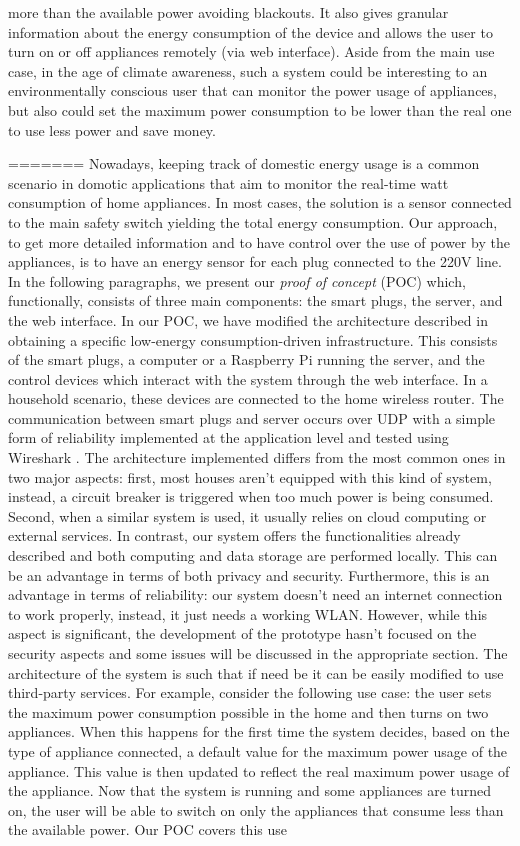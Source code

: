 \documentclass[conference]{IEEEtran}
\begin{document}
more than the available power avoiding blackouts. It also gives granular information about the energy consumption of the device and allows the user to turn on or off appliances remotely (via web interface). Aside from the main use case, in the age of climate awareness, such a system could be interesting to an environmentally conscious user that can monitor the power usage of appliances, but also could set the maximum power consumption to be lower than the real one to use less power and save money. 
	
=======
	Nowadays, keeping track of domestic energy usage is a common scenario in domotic applications that aim to monitor the real-time watt consumption of home appliances. In most cases, the solution is a sensor connected to the main safety switch yielding the total energy consumption. Our approach, to get more detailed information and to have control over the use of power by the appliances, is to have an energy sensor for each plug connected to the 220V line. In the following paragraphs, we present our \textit{proof of concept} (POC) which, functionally, consists of three main components: the smart plugs, the server, and the web interface. In our POC, we have modified the architecture described in \cite{8110428} obtaining a specific low-energy consumption-driven infrastructure. This consists of the smart plugs, a computer or a Raspberry Pi running the server, and the control devices which interact with the system through the web interface. In a household scenario, these devices are connected to the home wireless router. The communication between smart plugs and server occurs over UDP with a simple form of reliability implemented at the application level and tested using Wireshark \cite{wireshark}. The architecture implemented differs from the most common ones in two major aspects: first, most houses aren't equipped with this kind of system, instead, a circuit breaker is triggered when too much power is being consumed. Second, when a similar system is used, it usually relies on cloud computing or external services. In contrast, our system offers the functionalities already described and both computing and data storage are performed locally. This can be an advantage in terms of both privacy and security. Furthermore, this is an advantage in terms of reliability: our system doesn't need an internet connection to work properly, instead, it just needs a working WLAN. However, while this aspect is significant, the development of the prototype hasn't focused on the security aspects and some issues will be discussed in the appropriate section. The architecture of the system is such that if need be it can be easily modified to use third-party services. For example, consider the following use case: the user sets the maximum power consumption possible in the home and then turns on two appliances. When this happens for the first time the system decides, based on the type of appliance connected, a default value for the maximum power usage of the appliance. This value is then updated to reflect the real maximum power usage of the appliance. Now that the system is running and some appliances are turned on, the user will be able to switch on only the appliances that consume less than the available power. Our POC covers this use 
\end{document}
